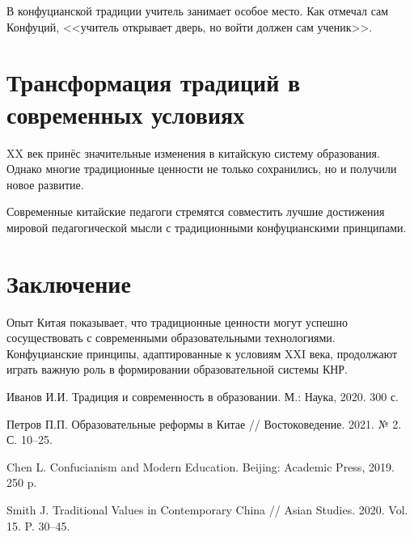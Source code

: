 \documentclass[12pt]{article}
\begin{document}
В конфуцианской традиции учитель занимает особое место. 
Как отмечал сам Конфуций, <<учитель открывает дверь, 
но войти должен сам ученик>>.

\section{Трансформация традиций в современных условиях}

XX век принёс значительные изменения в китайскую систему образования. 
Однако многие традиционные ценности не только сохранились, 
но и получили новое развитие.

Современные китайские педагоги стремятся совместить лучшие достижения 
мировой педагогической мысли с традиционными конфуцианскими принципами.

\section{Заключение}

Опыт Китая показывает, что традиционные ценности могут успешно 
сосуществовать с современными образовательными технологиями. 
Конфуцианские принципы, адаптированные к условиям XXI века, 
продолжают играть важную роль в формировании образовательной 
системы КНР.


\bibliographyru

\bibliosectioncyrillic
\begin{bibliolist}
\item Иванов И.И. Традиция и современность в образовании. М.: Наука, 2020. 300 с.
\item Петров П.П. Образовательные реформы в Китае // Востоковедение. 2021. № 2. С. 10--25.
\end{bibliolist}

\bibliosectionlatin
\begin{bibliolist}
\item Chen L. Confucianism and Modern Education. Beijing: Academic Press, 2019. 250 p.
\item Smith J. Traditional Values in Contemporary China // Asian Studies. 2020. Vol. 15. P. 30--45.
\end{bibliolist}


\end{document}
